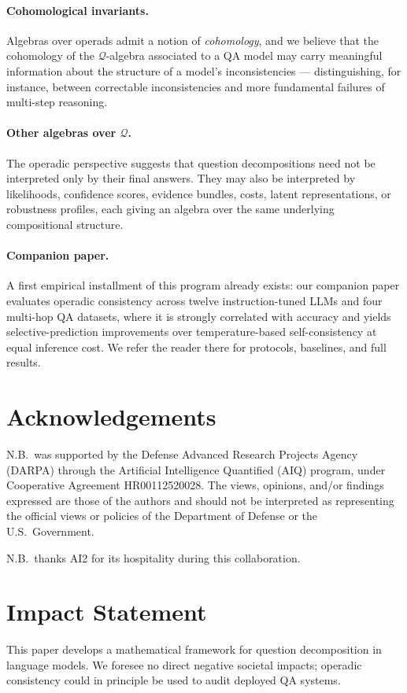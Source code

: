 \documentclass{article}
\theoremstyle{plain}
\theoremstyle{definition}
\theoremstyle{remark}
\theoremstyle{definition}
\newcommand\cQ{\mathcal{Q}}
\begin{document}
\paragraph{Cohomological invariants.}
Algebras over operads admit a notion of \emph{cohomology}, and we believe that the cohomology of the $\cQ$-algebra associated to a QA model may carry meaningful information about the structure of a model's inconsistencies --- distinguishing, for instance, between correctable inconsistencies and more fundamental failures of multi-step reasoning.

\paragraph{Other algebras over $\cQ$.}
The operadic perspective suggests that question decompositions need not be interpreted only by their final answers.
They may also be interpreted by likelihoods, confidence scores, evidence bundles, costs, latent representations, or robustness profiles, each giving an algebra over the same underlying compositional structure.

\paragraph{Companion paper.}
A first empirical installment of this program already exists: our companion paper \citep{bottman:operadic_consistency_empirical} evaluates operadic consistency across twelve instruction-tuned LLMs and four multi-hop QA datasets, where it is strongly correlated with accuracy and yields selective-prediction improvements over temperature-based self-consistency at equal inference cost. We refer the reader there for protocols, baselines, and full results.

\section*{Acknowledgements}

N.B.\ was supported by the Defense Advanced Research Projects Agency (DARPA) through the Artificial Intelligence Quantified (AIQ) program, under Cooperative Agreement HR00112520028.
The views, opinions, and/or findings expressed are those of the authors and should not be interpreted as representing the official views or policies of the Department of Defense or the U.S.\ Government.

N.B.\ thanks AI2 for its hospitality during this collaboration.

\section*{Impact Statement}

This paper develops a mathematical framework for question decomposition in language models.
We foresee no direct negative societal impacts; operadic consistency could in principle be used to audit deployed QA systems.

\printbibliography
\end{document}
